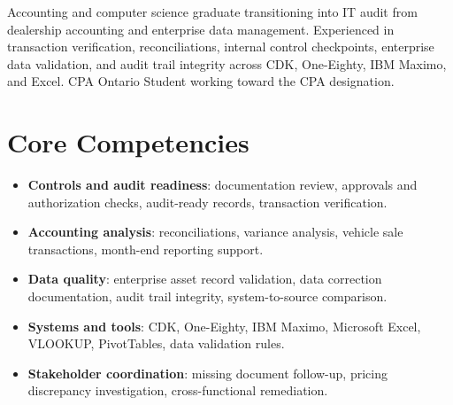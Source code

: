 \documentclass[11pt,a4paper,sans]{moderncv}
\begin{document}
\makecvtitle

\vspace{6pt}
\small{Accounting and computer science graduate transitioning into IT audit from dealership accounting and enterprise data management. Experienced in transaction verification, reconciliations, internal control checkpoints, enterprise data validation, and audit trail integrity across CDK, One-Eighty, IBM Maximo, and Excel. CPA Ontario Student working toward the CPA designation.}

\section{Core Competencies}
\vspace{1pt}
\begin{itemize}
\item \textbf{Controls and audit readiness}: documentation review, approvals and authorization checks, audit-ready records, transaction verification.
\item \textbf{Accounting analysis}: reconciliations, variance analysis, vehicle sale transactions, month-end reporting support.
\item \textbf{Data quality}: enterprise asset record validation, data correction documentation, audit trail integrity, system-to-source comparison.
\item \textbf{Systems and tools}: CDK, One-Eighty, IBM Maximo, Microsoft Excel, VLOOKUP, PivotTables, data validation rules.
\item \textbf{Stakeholder coordination}: missing document follow-up, pricing discrepancy investigation, cross-functional remediation.
\end{itemize}
\end{document}
